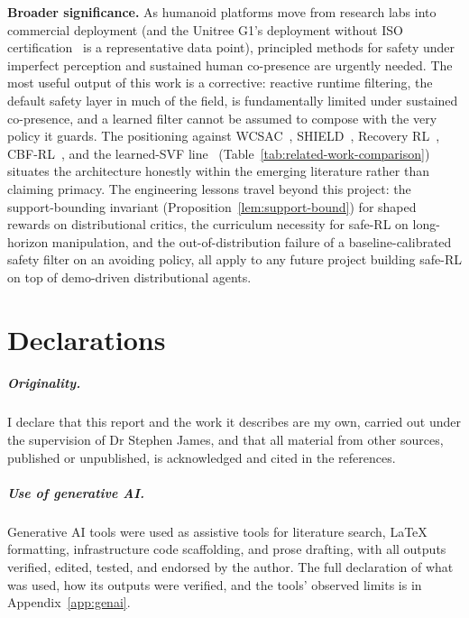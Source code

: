 \documentclass[11pt,a4paper]{report}
\begin{document}
\noindent
\textbf{Broader significance.}
As humanoid platforms move from research labs into commercial
deployment (and the Unitree G1's deployment without ISO
certification~\cite{unitree_g1} is a representative data point),
principled methods for safety under imperfect perception and
sustained human co-presence are urgently needed. The most useful
output of this work is a corrective: reactive runtime filtering, the
default safety layer in much of the field, is fundamentally limited
under sustained co-presence, and a learned filter cannot be assumed to
compose with the very policy it guards. The positioning against
WCSAC~\cite{yang2021wcsac}, SHIELD~\cite{shield2025}, Recovery
RL~\cite{thananjeyan2021recovery}, CBF-RL~\cite{cbfrl2024}, and the
learned-SVF line~\cite{srinivasan2020learning}
(Table~\ref{tab:related-work-comparison}) situates the architecture
honestly within the emerging literature rather than claiming primacy.
The engineering lessons travel beyond this project: the
support-bounding invariant (Proposition~\ref{lem:support-bound}) for
shaped rewards on distributional critics, the curriculum necessity for
safe-RL on long-horizon manipulation, and the out-of-distribution
failure of a baseline-calibrated safety filter on an avoiding policy,
all apply to any future project building safe-RL on top of demo-driven
distributional agents.
\fi


\clearpage
\chapter*{Declarations}

\paragraph{Originality.}
I declare that this report and the work it describes are my own,
carried out under the supervision of Dr Stephen James, and that all
material from other sources, published or unpublished, is
acknowledged and cited in the references.

\paragraph{Use of generative AI.}
Generative AI tools were used as assistive tools for literature
search, \LaTeX{} formatting, infrastructure code scaffolding, and
prose drafting, with all outputs verified, edited, tested, and
endorsed by the author. The full declaration of what was used, how
its outputs were verified, and the tools' observed limits is in
Appendix~\ref{app:genai}.
\end{document}
